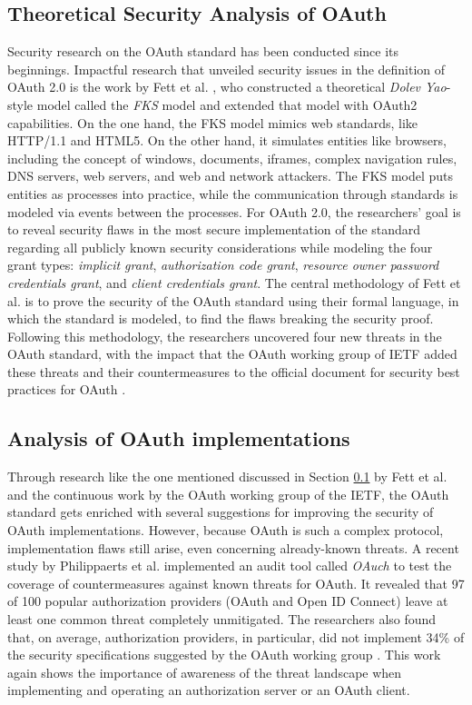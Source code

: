 \subsection{Theoretical Security Analysis of OAuth}
\label{subsec:fks_model}
Security research on the OAuth standard has been conducted since its beginnings. Impactful research that unveiled security issues in the definition of OAuth 2.0 is the work by Fett et al. \cite{fett2016comprehensive}, who constructed a theoretical \emph{Dolev Yao}-style model called the \emph{FKS} model and extended that model with OAuth2 capabilities. On the one hand, the FKS model mimics web standards, like HTTP/1.1 and HTML5. On the other hand, it simulates entities like browsers, including the concept of windows, documents, iframes, complex navigation rules, DNS servers, web servers, and web and network attackers. The FKS model puts entities as processes into practice, while the communication through standards is modeled via events between the processes. For OAuth 2.0, the researchers' goal is to reveal security flaws in the most secure implementation of the standard regarding all publicly known security considerations while modeling the four grant types: \emph{implicit grant}, \emph{authorization code grant}, \emph{resource owner password credentials grant}, and \emph{client credentials grant}. The central methodology of Fett et al. is to prove the security of the OAuth standard using their formal language, in which the standard is modeled, to find the flaws breaking the security proof. Following this methodology, the researchers uncovered four new threats in the  OAuth standard, with the impact that the OAuth working group of IETF added these threats and their countermeasures to the official document for security best practices for OAuth \cite{lodderstedt2020oauth}.

\subsection{Analysis of OAuth implementations}
Through research like the one mentioned discussed in Section \ref{subsec:fks_model} by Fett et al. and the continuous work by the OAuth working group of the IETF, the OAuth standard gets enriched with several suggestions for improving the security of OAuth implementations. However, because OAuth is such a complex protocol, implementation flaws still arise, even concerning already-known threats. A recent study by Philippaerts et al. implemented an audit tool called \emph{OAuch} to test the coverage of countermeasures against known threats for OAuth. It revealed that 97 of 100 popular authorization providers (OAuth and Open ID Connect) leave at least one common threat completely unmitigated. The researchers also found that, on average, authorization providers, in particular, did not implement 34\% of the security specifications suggested by the OAuth working group \cite{philippaerts2022oauch}. This work again shows the importance of awareness of the threat landscape when implementing and operating an authorization server or an OAuth client.

